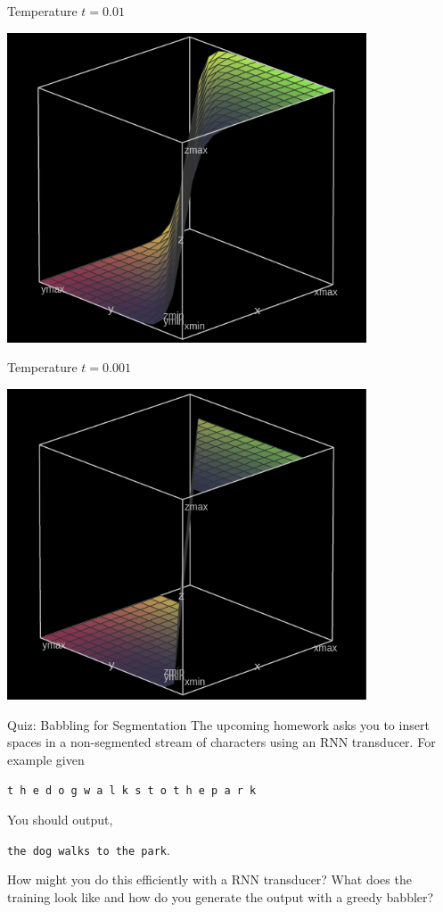 \documentclass{beamer}
\begin{document}
\begin{frame}{Temperature $t=0.01$}
  \begin{center}
    \includegraphics[width=0.8\textwidth]{sm01}
  \end{center}
\end{frame}

\begin{frame}{Temperature $t=0.001$}
  \begin{center}
    \includegraphics[width=0.8\textwidth]{sm001}
  \end{center}
\end{frame}


\begin{frame}{Quiz: Babbling for Segmentation}
  The upcoming homework asks you to insert spaces in a 
  non-segmented stream of characters using an RNN transducer.
  For example given

  \begin{center}
    \texttt{t h e d o g w a l k s t o t h e p a r k}
  \end{center}

  You should output,

  \begin{center}
    \texttt{the dog walks to the park}.
  \end{center}
  
  How might you do this efficiently with a RNN transducer?  What does
  the training look like and how do you generate the output with a
  greedy babbler?
\end{frame}
\end{document}
